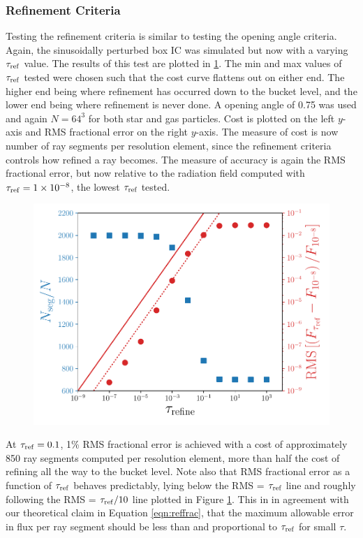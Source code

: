 \documentclass[fleq,usenatbib]{mnras}
\providecommand{\e}[1]{\ensuremath{\times10^{#1}}}
\newcommand{\tr}{\tau_{\rm ref}}
\begin{document}
\subsubsection{Refinement Criteria}
Testing the refinement criteria is similar to testing the opening angle 
criteria. Again, the sinusoidally perturbed box IC was simulated but now with 
a varying $\tr$ value. The results of this test are plotted in 
\ref{fig:refcrit}. The min and max values of $\tr$ tested were 
chosen such that the cost curve flattens out on either end. The higher end 
being where refinement has occurred down to the bucket level, and the lower 
end being where refinement is never done. A opening angle of 0.75 was used and 
again $N=64^3$ for both star and gas particles. Cost is plotted on the left 
$y$-axis and RMS fractional error on the right $y$-axis. The measure of cost 
is now number of ray segments per resolution element, since the refinement 
criteria controls how refined a ray becomes. The measure of accuracy is again 
the RMS fractional error, but now relative to the radiation field computed 
with $\tr=1\e{-8}$, the lowest $\tr$ tested.
\begin{figure}
\includegraphics[width=1\linewidth]{Figures/refinement_criteria.pdf}
\caption{}
\label{fig:refcrit}
\end{figure}

At $\tr=0.1$, 1\% RMS fractional error is achieved with a cost of 
approximately 850 ray segments computed per resolution element, more than half 
the cost of refining all the way to the bucket level. Note also that RMS 
fractional error as a function of $\tr$ behaves predictably, lying below the 
RMS = $\tr$ line and roughly following the RMS = $\tr/10$ line plotted in 
Figure \ref{fig:refcrit}. This in in agreement with our theoretical claim in 
Equation \ref{eqn:reffrac}, that the maximum allowable error in flux per ray 
segment should be less than and proportional to $\tr$ for small $\tau$. 
\end{document}
